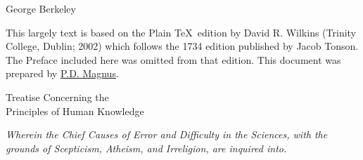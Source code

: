 \documentclass[]{article}
\newcommand*{\authortitle}[1]{\medskip\centerline{\Huge\sc #1}\bigskip}
\newcommand*{\itemtitle}[1]{\pagebreak[2]\begin{center}{\LARGE\sc #1}\end{center}}
\newcommand*{\itemsubtitle}[1]{\begin{center}\emph{#1}\end{center}}
\begin{document}

\authortitle{George Berkeley}



\noindent
This largely text is based on the Plain \TeX\ edition by David R. Wilkins (Trinity College, Dublin; 2002) which follows the 1734 edition published by Jacob Tonson. The Preface included here was omitted from that edition. This document was prepared by \href{https://www.fecundity.com}{P.D. Magnus}.
\itemtitle{Treatise Concerning the\\ Principles of Human Knowledge}
\itemsubtitle{Wherein the Chief Causes of Error and Difficulty in the Sciences, with the grounds of Scepticism, Atheism, and Irreligion, are inquired into.}



\setcounter{tocdepth}{1}
\tableofcontents

\pagestyle{fancy}
\lfoot{\thepage}
\cfoot{}


\bigskip
\end{document}
